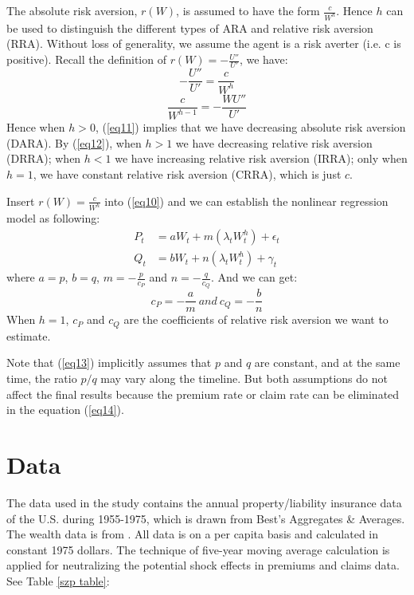 \documentclass[11pt, a4paper, leqno]{article}
\begin{document}
The absolute risk aversion, $r(W)$, is assumed to have the form $\frac{c}{W^{h}}$. Hence $h$ can be used to distinguish the different types of ARA and relative risk aversion (RRA). Without loss of generality, we assume the agent is a risk averter (i.e. c is positive). Recall the definition of $r(W)=-\frac{U''}{U'}$, we have:
\begin{equation}\label{eq11}
-\frac{U''}{U'}=\frac{c}{W^{h}}
\end{equation}
\begin{equation}\label{eq12}
\frac{c}{W^{h-1}}=-\frac{WU''}{U'}
\end{equation}
Hence when $h>0$, (\ref{eq11}) implies that we have decreasing absolute risk aversion (DARA). By (\ref{eq12}), when $h>1$ we have decreasing relative risk aversion (DRRA); when $h<1$ we have increasing relative risk aversion (IRRA); only when $h=1$, we have constant relative risk aversion (CRRA), which is just $c$. 

Insert $r(W)=\frac{c}{W^{h}}$ into (\ref{eq10}) and we can establish the nonlinear regression model as following:
\begin{equation}\label{eq13}
\begin{aligned}
P_{t}&=aW_{t}+m(\lambda_{t}W_{t}^{h})+\epsilon_{t}\\
Q_{t}&=bW_{t}+n(\lambda_{t}W_{t}^{h})+\gamma_{t}
\end{aligned}
\end{equation}
where $a=p$, $b=q$, $m=-\frac{p}{c_P}$ and $n=-\frac{q}{c_Q}$. And we can get:
\begin{equation}\label{eq14}
c_{P}=-\frac{a}{m}\ and\ c_{Q}=-\frac{b}{n}
\end{equation}
When $h=1$, $c_{P}$ and $c_{Q}$ are the coefficients of relative risk aversion we want to estimate.

Note that (\ref{eq13}) implicitly assumes that $p$ and $q$ are constant, and at the same time, the ratio $p/q$ may vary along the timeline. But both assumptions do not affect the final results because the premium rate or claim rate can be eliminated in the equation (\ref{eq14}).

\section{Data}\label{sec:data}

The data used in the \citet{szpiro1986measuring} study contains the annual property/liability insurance data of the U.S. during 1955-1975, which is drawn from Best's Aggregates \& Averages. The wealth data is from \citet{goldsmith2009national}. All data is on a per capita basis and calculated in constant 1975 dollars. The technique of five-year moving average calculation is applied for neutralizing the potential shock effects in premiums and claims data. See Table \ref{szp table}:
\end{document}
